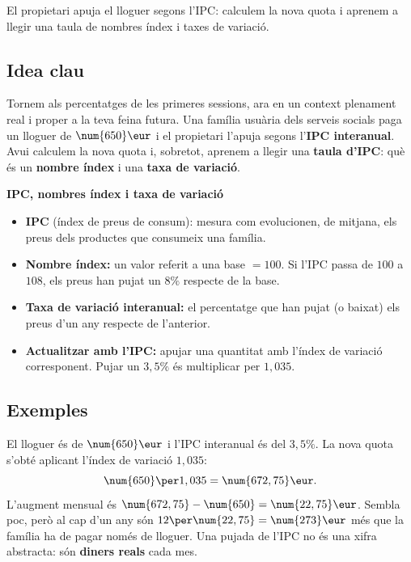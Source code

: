 %
{El propietari apuja el lloguer segons l'IPC: calculem la nova quota i aprenem a llegir una taula de nombres índex i taxes de variació.}

\subsection{Idea clau}

Tornem als percentatges de les primeres sessions, ara en un context plenament real i
proper a la teva feina futura. Una família usuària dels serveis socials paga un
lloguer de $\num{650}\eur$ i el propietari l'apuja segons l'\textbf{IPC interanual}.
Avui calculem la nova quota i, sobretot, aprenem a llegir una \textbf{taula d'IPC}:
què és un \textbf{nombre índex} i una \textbf{taxa de variació}.

\begin{idea}
\textbf{IPC, nombres índex i taxa de variació}
\begin{itemize}[leftmargin=1.4em, itemsep=2pt]
  \item \textbf{IPC} (índex de preus de consum): mesura com evolucionen, de mitjana,
        els preus dels productes que consumeix una família.
  \item \textbf{Nombre índex:} un valor referit a una base $=100$. Si l'IPC passa de
        $100$ a $108$, els preus han pujat un $8\%$ respecte de la base.
  \item \textbf{Taxa de variació interanual:} el percentatge que han pujat (o baixat)
        els preus d'un any respecte de l'anterior.
  \item \textbf{Actualitzar amb l'IPC:} apujar una quantitat amb l'índex de variació
        corresponent. Pujar un $3,5\%$ és multiplicar per $1,035$.
\end{itemize}
\end{idea}

\subsection{Exemples}

\begin{exemple}
El lloguer és de $\num{650}\eur$ i l'IPC interanual és del $3,5\%$. La nova quota
s'obté aplicant l'índex de variació $1,035$:
\[
\num{650}\per 1,035=\num{672,75}\eur.
\]
L'augment mensual és $\num{672,75}-\num{650}=\num{22,75}\eur$. Sembla poc, però al cap
d'un any són $12\per\num{22,75}=\num{273}\eur$ més que la família ha de pagar només de
lloguer. Una pujada de l'IPC no és una xifra abstracta: són \textbf{diners reals} cada
mes.
\end{exemple}

